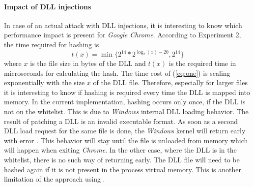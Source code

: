 \paragraph{Impact of \gls{DLL} injections}
In case of an actual attack with \gls{DLL} injections, it is interesting to know which performance impact is present for \emph{Google Chrome}. According to Experiment 2, the time required for hashing is
\begin{equation}
t(x) = \min\{2^{14} * 2^{\log_2(x) - 20}, 2^{14}\} \label{eq:one}
\end{equation}
where $x$ is the file size in bytes of the \gls{DLL} and $t(x)$ is the required time in microseconds for calculating the hash. The time cost of (\ref{eq:one}) is scaling exponentially with the size $x$ of the \gls{DLL} file. Therefore, especially for larger files it is interesting to know if hashing is required every time the \gls{DLL} is mapped into memory. In the current implementation, hashing occurs only once, if the \gls{DLL} is not on the whitelist. This is due to \emph{Windows} internal \gls{DLL} loading behavior. The result of patching a \gls{DLL} is an invalid executable format. As soon as a second \gls{DLL} load request for the same file is done, the \emph{Windows} kernel will return early with error . This behavior will stay until the file is unloaded from memory which will happen when exiting \emph{Chrome}. In the other case, where the \gls{DLL} is in the whitelist, there is no such way of returning early. The \gls{DLL} file will need to be hashed again if it is not present in the process virtual memory. This is another limitation of the approach using .
